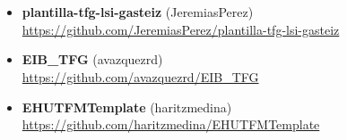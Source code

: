 
\providecommand{\tecla}[1]{\fbox{\footnotesize\texttt{#1}}\allowbreak}

\chapter{\guideTitle}
\label{ch:guide}

\section{\guideCredits}
\label{sec:guide_credits}
{\small\itshape\color{gray} \guideCreditsText}
\begin{itemize}
    \item \textbf{plantilla-tfg-lsi-gasteiz} (JeremiasPerez) \\ \url{https://github.com/JeremiasPerez/plantilla-tfg-lsi-gasteiz}
    \item \textbf{EIB\_TFG} (avazquezrd) \\ \url{https://github.com/avazquezrd/EIB_TFG}
    \item \textbf{EHUTFMTemplate} (haritzmedina) \\ \url{https://github.com/haritzmedina/EHUTFMTemplate}
\end{itemize}

\section{\gdVsTitle}
\label{sec:vscode}

\gdVsIntro

\subsection{\gdReqTitle}
\label{subsec:vscode_prerequisites}

